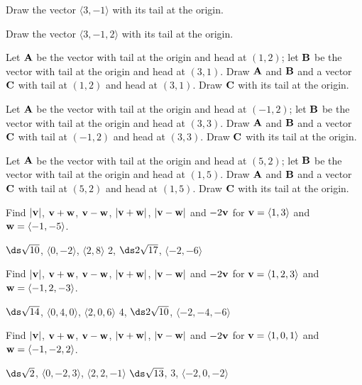 \begin{exercises}

\exercise Draw the vector $\langle 3,-1\rangle$ with its tail at the
origin. 

\exercise Draw the vector $\langle 3,-1,2\rangle$ with its tail at the
origin. 

\exercise Let ${\bf A}$ be the vector with tail at the origin and head
at $(1,2)$; let ${\bf B}$ be the vector with tail at the origin and head
at $(3,1)$. Draw ${\bf A}$ and ${\bf B}$ and a vector ${\bf C}$ with 
tail at $(1,2)$ and head at $(3,1)$. Draw $\bf C$ with its tail at the origin.

\exercise Let ${\bf A}$ be the vector with tail at the origin and head
at $(-1,2)$; let ${\bf B}$ be the vector with tail at the origin and head
at $(3,3)$. Draw ${\bf A}$ and ${\bf B}$ and a vector ${\bf C}$ with 
tail at $(-1,2)$ and head at $(3,3)$. Draw $\bf C$ with its tail at the origin.

\exercise Let ${\bf A}$ be the vector with tail at the origin and head
at $(5,2)$; let ${\bf B}$ be the vector with tail at the origin and head
at $(1,5)$. Draw ${\bf A}$ and ${\bf B}$ and a vector ${\bf C}$ with 
tail at $(5,2)$ and head at $(1,5)$. Draw $\bf C$ with its tail at the origin.

\exercise Find $|{\bf v}|$, ${\bf v}+{\bf w}$, ${\bf v}-{\bf w}$,
$|{\bf v}+{\bf w}|$, $|{\bf v}-{\bf w}|$ and $-2{\bf v}$ for
${\bf v} = \langle 1,3\rangle$ and ${\bf w} = \langle -1,-5\rangle$.
\begin{answer} $\ds \sqrt{10}$, $\langle 0,-2\rangle$, $\langle 2,8\rangle$
2, $\ds 2\sqrt{17}$, $\langle -2,-6\rangle$
\end{answer}

\exercise Find $|{\bf v}|$, ${\bf v}+{\bf w}$, ${\bf v}-{\bf w}$,
$|{\bf v}+{\bf w}|$, $|{\bf v}-{\bf w}|$ and $-2{\bf v}$ for
${\bf v} = \langle 1,2,3\rangle$ and ${\bf w} = \langle -1,2,-3\rangle$.
\begin{answer} $\ds \sqrt{14}$, $\langle 0,4,0\rangle$, $\langle 2,0,6\rangle$
4, $\ds 2\sqrt{10}$, $\langle -2,-4,-6\rangle$
\end{answer}

\exercise Find $|{\bf v}|$, ${\bf v}+{\bf w}$, ${\bf v}-{\bf w}$,
$|{\bf v}+{\bf w}|$, $|{\bf v}-{\bf w}|$ and $-2{\bf v}$ for
${\bf v} = \langle 1,0,1\rangle$ and ${\bf w} = \langle -1,-2,2 \rangle$.
\begin{answer} $\ds \sqrt{2}$, $\langle 0,-2,3\rangle$, $\langle 2,2,-1\rangle$
$\ds \sqrt{13}$, $3$, $\langle -2, 0, -2\rangle$
\end{answer}


\end{exercises}
